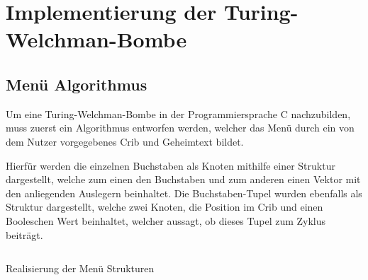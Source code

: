 \part{Implementierung der Turing-Welchman-Bombe}\label{ch:impl_bombe}


\chapter{Menü Algorithmus}\label{sec:cycle-finding-algorithm}
Um eine Turing-Welchman-Bombe in der Programmiersprache C nachzubilden, muss zuerst ein Algorithmus entworfen werden, welcher das Menü durch ein von dem Nutzer vorgegebenes Crib und 
Geheimtext bildet.

Hierfür werden die einzelnen Buchstaben als Knoten mithilfe einer Struktur dargestellt, welche zum einen den Buchstaben und zum anderen einen Vektor mit den anliegenden Auslegern beinhaltet.
Die Buchstaben-Tupel wurden ebenfalls als Struktur dargestellt, welche zwei Knoten, die Position im Crib und einen Booleschen Wert beinhaltet, welcher aussagt, ob dieses Tupel zum Zyklus beiträgt.

\begin{mylisting}
	\inputminted{C}{Implementierung/menu_structs.c}
	\caption{Realisierung der Menü Strukturen}
	\label{lst:code_impl_menu}
\end{mylisting}

%	

